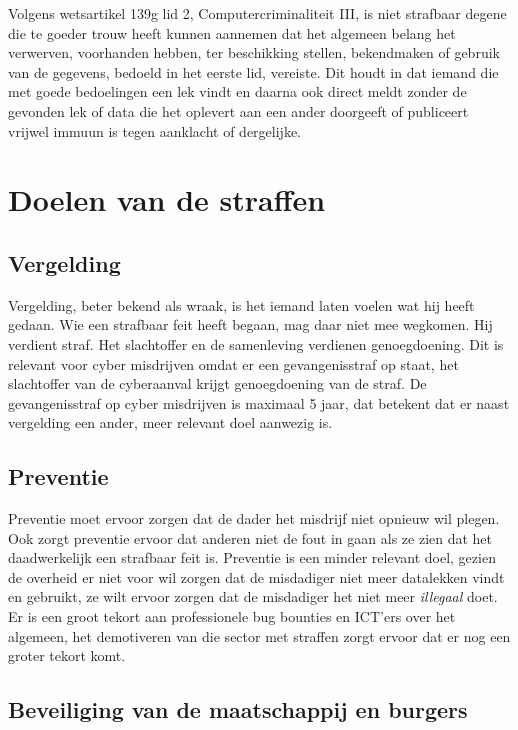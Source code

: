 \documentclass[
]{article}
\begin{document}
Volgens wetsartikel 139g lid 2, Computercriminaliteit III, is niet
strafbaar degene die te goeder trouw heeft kunnen aannemen dat het
algemeen belang het verwerven, voorhanden hebben, ter beschikking
stellen, bekendmaken of gebruik van de gegevens, bedoeld in het eerste
lid, vereiste. Dit houdt in dat iemand die met goede bedoelingen een lek
vindt en daarna ook direct meldt zonder de gevonden lek of data die het
oplevert aan een ander doorgeeft of publiceert vrijwel immuun is tegen
aanklacht of dergelijke.
\pagebreak
\hypertarget{doelen-van-de-straffen}{%
\section{Doelen van de straffen}\label{doelen-van-de-straffen}}

\hypertarget{vergelding}{%
\subsection{Vergelding}\label{vergelding}}

Vergelding, beter bekend als wraak, is het iemand laten voelen wat hij
heeft gedaan. Wie een strafbaar feit heeft begaan, mag daar niet mee
wegkomen. Hij verdient straf. Het slachtoffer en de samenleving
verdienen genoegdoening. Dit is relevant voor cyber misdrijven omdat er
een gevangenisstraf op staat, het slachtoffer van de cyberaanval krijgt
genoegdoening van de straf. De gevangenisstraf op cyber misdrijven is
maximaal 5 jaar, dat betekent dat er naast vergelding een ander, meer
relevant doel aanwezig is.

\hypertarget{preventie}{%
\subsection{Preventie}\label{preventie}}

Preventie moet ervoor zorgen dat de dader het misdrijf niet opnieuw wil
plegen. Ook zorgt preventie ervoor dat anderen niet de fout in gaan als
ze zien dat het daadwerkelijk een strafbaar feit is. Preventie is een
minder relevant doel, gezien de overheid er niet voor wil zorgen dat de
misdadiger niet meer datalekken vindt en gebruikt, ze wilt ervoor zorgen
dat de misdadiger het niet meer \emph{illegaal} doet. Er is een groot
tekort aan professionele bug bounties en ICT'ers over het algemeen, het
demotiveren van die sector met straffen zorgt ervoor dat er nog een
groter tekort komt.

\hypertarget{beveiliging-van-de-maatschappij-en-burgers}{%
\subsection{Beveiliging van de maatschappij en
burgers}\label{beveiliging-van-de-maatschappij-en-burgers}}
\end{document}
